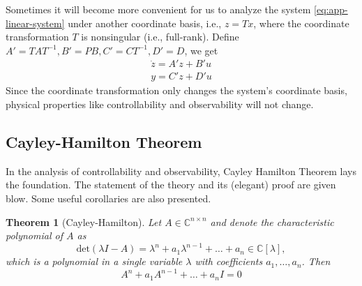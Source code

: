 \documentclass[
]{book}
\newtheorem{theorem}{Theorem}[chapter]
\theoremstyle{definition}
\theoremstyle{definition}
\theoremstyle{definition}
\theoremstyle{definition}
\theoremstyle{remark}
\begin{document}
Sometimes it will become more convenient for us to analyze the system \eqref{eq:app-linear-system} under another coordinate basis, i.e., \(z = T x\), where the coordinate transformation \(T\) is nonsingular (i.e., full-rank). Define \(A' = TAT^{-1}, B' = PB, C' = CT^{-1}, D' = D\), we get
\begin{equation*}
   \begin{split}
      \dot{z} = A' z + B' u \\ 
      y = C' z + D' u
   \end{split}
\end{equation*}
Since the coordinate transformation only changes the system's coordinate basis, physical properties like controllability and observability will not change.

\hypertarget{cayley-hamilton-theorem}{%
\subsection{Cayley-Hamilton Theorem}\label{cayley-hamilton-theorem}}

In the analysis of controllability and observability, Cayley Hamilton Theorem lays the foundation. The statement of the theory and its (elegant) proof are given blow. Some useful corollaries are also presented.

\begin{theorem}[Cayley-Hamilton]
\protect\hypertarget{thm:cayham}{}\label{thm:cayham}Let \(A \in \mathbb{C}^{n \times n}\) and denote the characteristic polynomial of \(A\) as
\[
   \text{det}(\lambda I - A) = \lambda^n + a_1 \lambda^{n-1} + \dots + a_n \in \mathbb{C}[\lambda],
\]
which is a polynomial in a single variable \(\lambda\) with coefficients \(a_1,\dots,a_n\).
Then
\[
   A^n + a_1 A^{n-1} + \dots + a_n I = 0
\]
\end{theorem}
\end{document}

